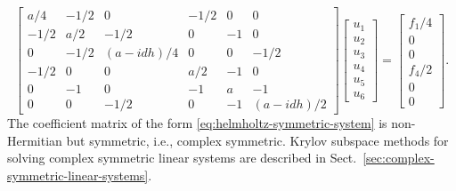 \begin{equation}\label{eq:helmholtz-symmetric-system}
\begin{bmatrix}
a/4&-1/2&0&-1/2&0&0\\-1/2&a/2&-1/2&0&-1&0\\0&-1/2&(a-idh)/4&0&0&-1/2\\
-1/2&0&0&a/2&-1&0\\0&-1&0&-1&a&-1\\0&0&-1/2&0&-1&(a-idh)/2
\end{bmatrix}
\begin{bmatrix}u_1\\u_2\\u_3\\u_4\\u_5\\u_6\end{bmatrix}
=\begin{bmatrix}f_1/4\\0\\0\\f_4/2\\0\\0\end{bmatrix}.
\end{equation}
{The coefficient matrix of the form \eqref{eq:helmholtz-symmetric-system} is non-Hermitian but symmetric, i.e., complex symmetric. Krylov subspace methods for solving complex symmetric linear systems are described in Sect.\ \ref{sec:complex-symmetric-linear-systems}.}
